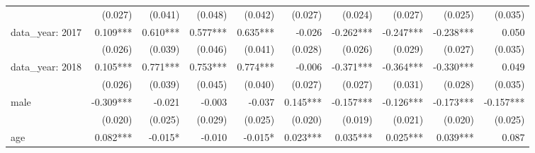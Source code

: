 \begin{tabular}{lrrrrrrrrr}
                             &                        (0.027) &                     (0.041) &                         (0.048) &                          (0.042) &                     (0.027) &                     (0.024) &                         (0.027) &                          (0.025) &                    (0.035) \\ 
data_year: 2017              &                       0.109*** &                    0.610*** &                        0.577*** &                         0.635*** &                      -0.026 &                   -0.262*** &                       -0.247*** &                        -0.238*** &                      0.050 \\ 
                             &                        (0.026) &                     (0.039) &                         (0.046) &                          (0.041) &                     (0.028) &                     (0.026) &                         (0.029) &                          (0.027) &                    (0.035) \\ 
data_year: 2018              &                       0.105*** &                    0.771*** &                        0.753*** &                         0.774*** &                      -0.006 &                   -0.371*** &                       -0.364*** &                        -0.330*** &                      0.049 \\ 
                             &                        (0.026) &                     (0.039) &                         (0.045) &                          (0.040) &                     (0.027) &                     (0.027) &                         (0.031) &                          (0.028) &                    (0.035) \\ 
male                         &                      -0.309*** &                      -0.021 &                          -0.003 &                           -0.037 &                    0.145*** &                   -0.157*** &                       -0.126*** &                        -0.173*** &                  -0.157*** \\ 
                             &                        (0.020) &                     (0.025) &                         (0.029) &                          (0.025) &                     (0.020) &                     (0.019) &                         (0.021) &                          (0.020) &                    (0.025) \\ 
age                          &                       0.082*** &                     -0.015* &                          -0.010 &                          -0.015* &                    0.023*** &                    0.035*** &                        0.025*** &                         0.039*** &                      0.087 \\ 

\end{tabular}
